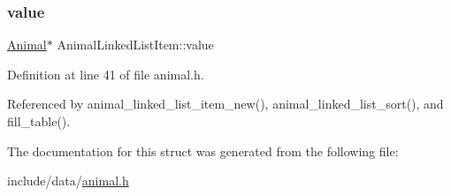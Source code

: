 \mbox{\label{struct_animal_linked_list_item_a6beaaaa5100f3f9f3cb09b5746208047}} 
\subsubsection{\texorpdfstring{value}{value}}
{\footnotesize\ttfamily \mbox{\hyperlink{struct_animal}{Animal}}$\ast$ Animal\+Linked\+List\+Item\+::value}



Definition at line 41 of file animal.\+h.



Referenced by animal\+\_\+linked\+\_\+list\+\_\+item\+\_\+new(), animal\+\_\+linked\+\_\+list\+\_\+sort(), and fill\+\_\+table().



The documentation for this struct was generated from the following file\+:\begin{DoxyCompactItemize}
\item 
include/data/\mbox{\hyperlink{animal_8h}{animal.\+h}}\end{DoxyCompactItemize}
